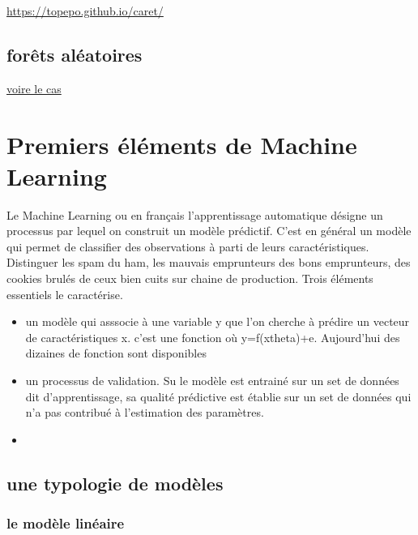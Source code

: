 \documentclass[
]{book}
\begin{document}
\url{https://topepo.github.io/caret/}

\hypertarget{foruxeats-aluxe9atoires}{%
\section{forêts aléatoires}\label{foruxeats-aluxe9atoires}}

\href{http://r.benavent.fr/caret.html}{voire le cas}

\hypertarget{premiers-uxe9luxe9ments-de-machine-learning}{%
\chapter{Premiers éléments de Machine Learning}\label{premiers-uxe9luxe9ments-de-machine-learning}}

Le Machine Learning ou en français l'apprentissage automatique désigne un processus par lequel on construit un modèle prédictif. C'est en général un modèle qui permet de classifier des observations à parti de leurs caractéristiques. Distinguer les spam du ham, les mauvais emprunteurs des bons emprunteurs, des cookies brulés de ceux bien cuits sur chaine de production. Trois éléments essentiels le caractérise.

\begin{itemize}
\item
  un modèle qui asssocie à une variable y que l'on cherche à prédire un vecteur de caractéristiques x. c'est une fonction où y=f(x\textbar theta)+e. Aujourd'hui des dizaines de fonction sont disponibles
\item
  un processus de validation. Su le modèle est entrainé sur un set de données dit d'apprentissage, sa qualité prédictive est établie sur un set de données qui n'a pas contribué à l'estimation des paramètres.
\item
\end{itemize}

\hypertarget{une-typologie-de-moduxe8les}{%
\section{une typologie de modèles}\label{une-typologie-de-moduxe8les}}

\hypertarget{le-moduxe8le-linuxe9aire}{%
\subsection{le modèle linéaire}\label{le-moduxe8le-linuxe9aire}}
\end{document}
